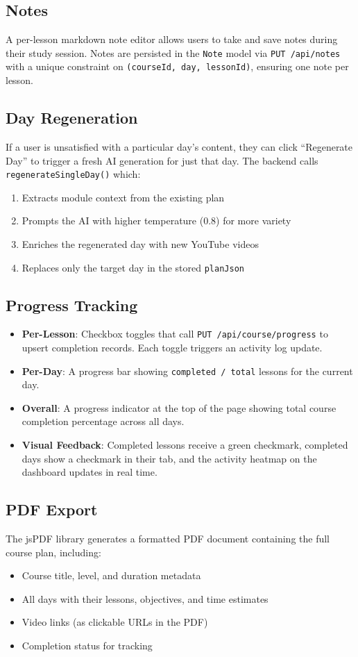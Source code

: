 \documentclass[12pt,a4paper]{report}
\begin{document}
\subsection{Notes}
A per-lesson markdown note editor allows users to take and save notes during their study session. Notes are persisted in the \texttt{Note} model via \texttt{PUT /api/notes} with a unique constraint on \texttt{(courseId, day, lessonId)}, ensuring one note per lesson.

\subsection{Day Regeneration}
If a user is unsatisfied with a particular day's content, they can click ``Regenerate Day'' to trigger a fresh AI generation for just that day. The backend calls \texttt{regenerateSingleDay()} which:
\begin{enumerate}[noitemsep]
    \item Extracts module context from the existing plan
    \item Prompts the AI with higher temperature (0.8) for more variety
    \item Enriches the regenerated day with new YouTube videos
    \item Replaces only the target day in the stored \texttt{planJson}
\end{enumerate}

\subsection{Progress Tracking}
\begin{itemize}[noitemsep]
    \item \textbf{Per-Lesson}: Checkbox toggles that call \texttt{PUT /api/course/progress} to upsert completion records. Each toggle triggers an activity log update.
    \item \textbf{Per-Day}: A progress bar showing \texttt{completed / total} lessons for the current day.
    \item \textbf{Overall}: A progress indicator at the top of the page showing total course completion percentage across all days.
    \item \textbf{Visual Feedback}: Completed lessons receive a green checkmark, completed days show a checkmark in their tab, and the activity heatmap on the dashboard updates in real time.
\end{itemize}

\subsection{PDF Export}
The jsPDF library generates a formatted PDF document containing the full course plan, including:
\begin{itemize}[noitemsep]
    \item Course title, level, and duration metadata
    \item All days with their lessons, objectives, and time estimates
    \item Video links (as clickable URLs in the PDF)
    \item Completion status for tracking
\end{itemize}
\end{document}
